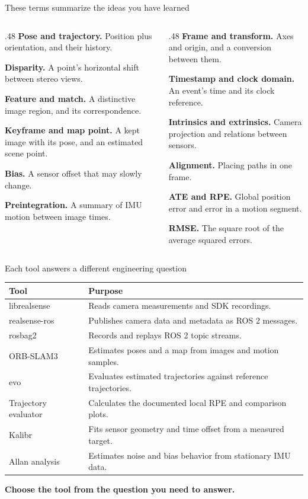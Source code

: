 \documentclass[aspectratio=169,12pt,t]{beamer}
\newcommand{\para}[1]{#1\par\medskip}
\newcommand{\lesson}[1]{\vfill{\color{teal!70!black}\bfseries #1}\par}
\newcommand{\twocol}[2]{\begin{columns}[T,onlytextwidth]\begin{column}{.48\textwidth}#1\end{column}\begin{column}{.48\textwidth}#2\end{column}\end{columns}}
\begin{document}
\begin{frame}{These terms summarize the ideas you have learned}

\twocol{
\para{\textbf{Pose and trajectory.} Position plus orientation, and their history.}
\para{\textbf{Disparity.} A point's horizontal shift between stereo views.}
\para{\textbf{Feature and match.} A distinctive image region, and its correspondence.}
\para{\textbf{Keyframe and map point.} A kept image with its pose, and an estimated scene point.}
\para{\textbf{Bias.} A sensor offset that may slowly change.}
\para{\textbf{Preintegration.} A summary of IMU motion between image times.}
}{
\para{\textbf{Frame and transform.} Axes and origin, and a conversion between them.}
\para{\textbf{Timestamp and clock domain.} An event's time and its clock reference.}
\para{\textbf{Intrinsics and extrinsics.} Camera projection and relations between sensors.}
\para{\textbf{Alignment.} Placing paths in one frame.}
\para{\textbf{ATE and RPE.} Global position error and error in a motion segment.}
\para{\textbf{RMSE.} The square root of the average squared errors.}
}

\end{frame}

\begin{frame}{Each tool answers a different engineering question}

\begin{tabular}{@{}p{42mm}p{145mm}@{}}\toprule
\textbf{Tool} & \textbf{Purpose}\\\midrule
librealsense & Reads camera measurements and SDK recordings.\\[6pt]
realsense-ros & Publishes camera data and metadata as ROS 2 messages.\\[6pt]
rosbag2 & Records and replays ROS 2 topic streams.\\[6pt]
ORB-SLAM3 & Estimates poses and a map from images and motion samples.\\[6pt]
evo & Evaluates estimated trajectories against reference trajectories.\\[6pt]
Trajectory evaluator & Calculates the documented local RPE and comparison plots.\\[6pt]
Kalibr & Fits sensor geometry and time offset from a measured target.\\[6pt]
Allan analysis & Estimates noise and bias behavior from stationary IMU data.\\\bottomrule
\end{tabular}
\lesson{Choose the tool from the question you need to answer.}

\end{frame}
\end{document}
